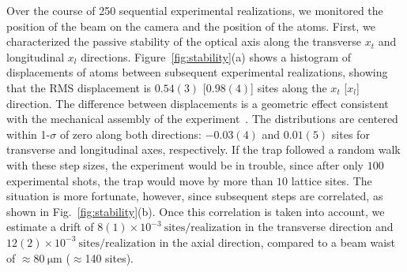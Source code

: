 \documentclass[twocolumn,aps,pra,showpacs,preprintnumbers,bibnotes]{revtex4-1}
\newcommand\unit[2]{\ensuremath{#1~\mathrm{{#2}}}}
\begin{document}
Over the course of 250 sequential experimental realizations, we monitored the position of the beam on the camera and the position of the atoms.
First, we characterized the passive stability of the optical axis along the transverse $x_t$ and longitudinal $x_l$ directions.
Figure~\ref{fig:stability}(a) shows a histogram of displacements of atoms between subsequent experimental realizations, showing that the RMS displacement is $0.54(3)$ [$0.98(4)$] sites along the $x_t$ [$x_l$] direction.
The difference between displacements is a geometric effect consistent with the mechanical assembly of the experiment~\cite{Huber2014}.
The distributions are centered within 1-$\sigma$ of zero along both directions: $-0.03(4)$ and $0.01(5)$ sites for transverse and longitudinal axes, respectively.
If the trap followed a random walk with these step sizes, the experiment would be in trouble, since after only $100$ experimental shots, the trap would move by more than $10$ lattice sites.
The situation is more fortunate, however, since subsequent steps are correlated, as shown in Fig.~\ref{fig:stability}(b).
Once this correlation is taken into account, we estimate a drift of \unit{8(1)\times 10^{-3}}{sites/realization} in the transverse direction and \unit{12(2)\times 10^{-3}}{sites/realization} in the axial direction, compared to a beam waist of $\approx$\unit{80}{\mu{}m} ($\approx$140 sites).
\end{document}
